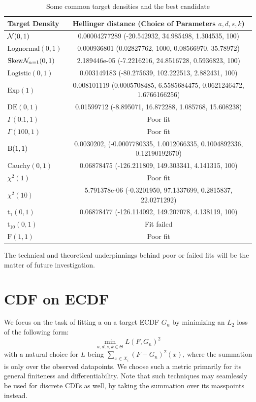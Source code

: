 \begin{table}[h!]
    \centering
    \begin{tabularx}{\textwidth}{X|c}
        \toprule
        Target Density & Hellinger distance (Choice of Parameters $a,d,s,k$)\\
        \midrule
        $\mathcal{N}(0,1)$ & 0.00004277289 (-20.542932, 34.985498, 1.304535, 100)\\
        $\mathrm{Lognormal}(0,1)$ & 0.000936801 (0.02827762, 1000, 0.08566970, 35.78972) \\
        $\mathrm{Skew}\mathcal{N}_{\alpha=1} (0,1)$ & 2.189446e-05 (-7.2216216, 24.8516728, 0.5936823, 100) \\
        \hline
        $\mathrm{Logistic}(0,1)$ & 0.003149183 (-80.275639, 102.222513, 2.882431, 100) \\
        $\mathrm{Exp}(1)$ & 0.008101119 (0.0005708485, 6.5585684475, 0.0621246472, 1.6766166256) \\
        $\mathrm{DE}(0,1)$ & 0.01599712 (-8.895071, 16.872288, 1.085768, 15.608238) \\
        \hline
        $\Gamma(0.1,1)$ & Poor fit \\
        $\Gamma(100,1)$ & Poor fit \\
        $\mathrm B(1,1)$ & 0.0030202, (-0.0007780335, 1.0012066335, 0.1004892336, 0.12190192670) \\
        \hline
        $\mathrm{Cauchy}(0,1)$ & 0.06878475 (-126.211809, 149.303341, 4.141315, 100) \\
        \hline
        $\chi^2(1)$ & Poor fit \\
        $\chi^2(10)$ & 5.791378e-06 (-0.3201950, 97.1337699, 0.2815837, 22.0271292) \\
        $\mathrm{t}_1(0,1)$ & 0.06878477 (-126.114092, 149.207078, 4.138119, 100) \\
        $\mathrm{t}_{10}(0,1)$ & Fit failed \\
        $\mathrm{F}(1,1)$ & Poor fit \\
        \bottomrule
    \end{tabularx}
    \caption{Some common target densities and the best candidate \sindist{}}
    \label{tab:fitpdf}
\end{table}

The technical and theoretical underpinnings behind poor or failed fits will be the matter of future investigation.

\section{CDF on ECDF}\label{sec:cdffit}
We focus on the task of fitting a \sindist{} on a target ECDF $G_n$ by minimizing an $L_2$ loss of the following form:
\[\min_{a,d,s,k \in \Theta} L(F, G_n)^2\]
with a natural choice for $L$ being $\sum_{x \in X_i} (F-G_n)^2(x)$, where the summation is only over the observed datapoints. We choose such a metric primarily for its general finiteness and differentiability. Note that such techniques may seamlessly be used for discrete CDFs as well, by taking the summation over its masspoints instead.

